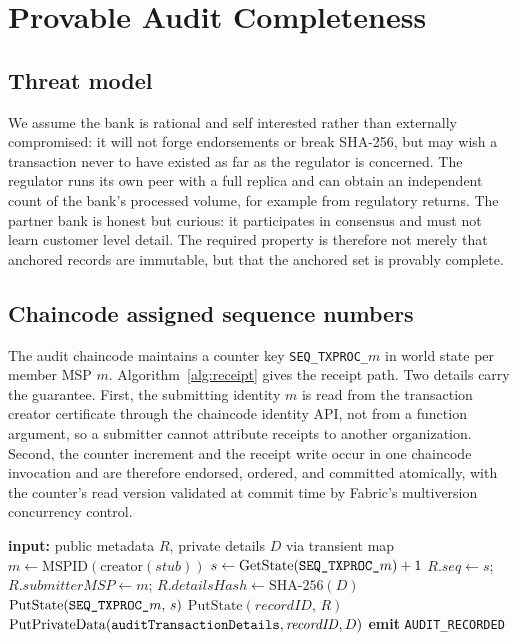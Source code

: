 \documentclass[conference]{IEEEtran}
\begin{document}
\section{Provable Audit Completeness}
\label{sec:complete}

\subsection{Threat model}

We assume the bank is rational and self interested rather than externally
compromised: it will not forge endorsements or break SHA-256, but may wish a
transaction never to have existed as far as the regulator is concerned. The
regulator runs its own peer with a full replica and can obtain an independent
count of the bank's processed volume, for example from regulatory returns. The
partner bank is honest but curious: it participates in consensus and must not
learn customer level detail. The required property is therefore not merely that
anchored records are immutable, but that the anchored set is provably complete.

\subsection{Chaincode assigned sequence numbers}

The audit chaincode maintains a counter key \texttt{SEQ\_TXPROC\_}$m$ in world
state per member MSP $m$. Algorithm~\ref{alg:receipt} gives the receipt path.
Two details carry the guarantee. First, the submitting identity $m$ is read from
the transaction creator certificate through the chaincode identity API, not from
a function argument, so a submitter cannot attribute receipts to another
organization. Second, the counter increment and the receipt write occur in one
chaincode invocation and are therefore endorsed, ordered, and committed
atomically, with the counter's read version validated at commit time by Fabric's
multiversion concurrency control.

\begin{algorithm}[t]
\caption{RecordTransactionProcessed with sequence assignment}
\label{alg:receipt}
\begin{algorithmic}[1]
\STATE \textbf{input:} public metadata $R$, private details $D$ via transient map
\STATE $m \leftarrow \mathrm{MSPID}(\mathrm{creator}(\mathit{stub}))$
  \hfill {}
\STATE $s \leftarrow \mathrm{GetState}(\text{\texttt{SEQ\_TXPROC\_}}m) + 1$
\STATE $R.\mathit{seq} \leftarrow s$;\;
       $R.\mathit{submitterMSP} \leftarrow m$;\;
       $R.\mathit{detailsHash} \leftarrow \mathrm{SHA\text{-}256}(D)$
\STATE $\mathrm{PutState}(\text{\texttt{SEQ\_TXPROC\_}}m,\, s)$
\STATE $\mathrm{PutState}(\mathit{recordID},\, R)$
\STATE $\mathrm{PutPrivateData}(\text{\texttt{auditTransactionDetails}},
       \mathit{recordID}, D)$
\STATE \textbf{emit} \texttt{AUDIT\_RECORDED}
\end{algorithmic}
\end{algorithm}
\end{document}
